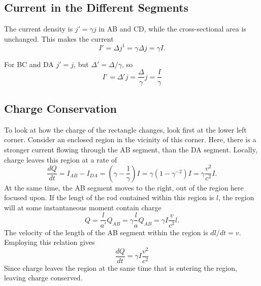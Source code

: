 \documentclass[11pt]{amsart}
\begin{document}
\subsection{Current in the Different Segments}
The current density is $j' = \gamma j$ in AB and CD, while the cross-sectional area is unchanged. This makes the current
\begin{equation}
I' = \Delta j^1 = \gamma\Delta j = \gamma I.
\end{equation}

For BC and DA $j' = j$, but $\Delta' = \Delta / \gamma$, so
\begin{equation}
I' = \Delta'j = \frac{\Delta}{\gamma}j = \frac{I}{\gamma}
\end{equation}

\subsection{Charge Conservation}
To look at how the charge of the rectangle changes, look first at the lower left corner. Consider an enclosed region in the vicinity of this corner. Here, there is a stronger current flowing through the AB segment, than the DA segment. Locally, charge leaves this region at a rate of
\begin{equation}
\frac{dQ}{dt} = I_{AB} - I_{DA} = \left(\gamma - \frac{1}{\gamma}\right)I = \gamma(1-\gamma^{-2})I = \gamma\frac{v^2}{c^2}I.
\end{equation}
At the same time, the AB segment moves to the right, out of the region here focused upon. If the lengt of the rod contained within this region is $l$, the region will at some instantaneous moment contain charge
\begin{equation}
Q = \frac{l}{a'}Q_{AB} = \gamma\frac{l}{a}Q_{AB} = \gamma I \frac{v}{c^2}l.
\end{equation}
The velocity of the length of the AB segment within the region is $dl/dt = v$. Employing this relation gives
\begin{equation}
\frac{dQ}{dt} = \gamma I \frac{v^2}{c^2}
\end{equation}
Since charge leaves the region at the same time that is entering the region, leaving charge conserved.
\end{document}
